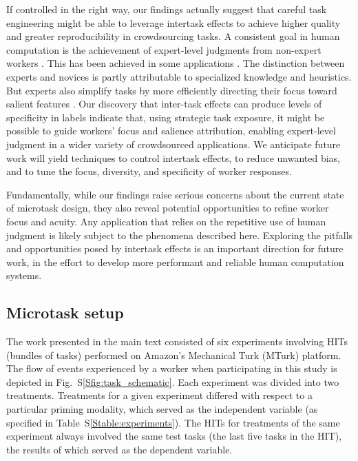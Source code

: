 \documentclass{pnastwo}
\begin{document}
\begin{article}
If controlled in the right way, our findings actually suggest that careful task
engineering might be able to leverage intertask effects to achieve higher 
quality and greater reproducibility in crowdsourcing tasks.  A consistent goal
in human computation is the achievement of expert-level judgments from
non-expert workers \cite{kittur2011crowdforge}.  This has been achieved in some
applications \cite{snow2008cheap,Mortensen20131020,Warby2014385}.  The
distinction between experts and novices is partly attributable to specialized
knowledge and heuristics.  But experts also simplify tasks by more efficiently
directing their focus toward salient features \cite{kellman2009perceptual}.
Our discovery that inter-task effects can produce levels of specificity in
labels indicate that, using strategic task exposure, it might be possible to
guide workers' focus and salience attribution, enabling expert-level judgment
in a wider variety of crowdsourced applications.  We anticipate future work
will yield techniques to control intertask effects, to reduce unwanted bias,
and to tune the focus, diversity, and specificity of worker responses.

Fundamentally, while our findings raise serious concerns about the current
state of microtask design, they also reveal potential opportunities to refine
worker focus and acuity.  Any application that relies on the repetitive use of
human judgment is likely subject to the phenomena described here.  Exploring
the pitfalls and opportunities posed by intertask effects is an important
direction for future work, in the effort to develop more performant and
reliable human computation systems.

\begin{materials}

\section{Microtask setup} The work presented in the main text consisted of six
experiments involving HITs (bundles of tasks) performed on Amazon's Mechanical
Turk (MTurk) platform.  The flow of events experienced by a worker when
participating in this study is depicted in Fig.~S\ref{Sfig:task_schematic}.
Each experiment was divided into two treatments.  Treatments for a given
experiment differed with respect to a particular priming modality, which served
as the independent variable (as specified in Table~S\ref{Stable:experiments}).
The HITs for treatments of the same experiment always involved the same test
tasks (the last five tasks in the HIT), the results of which served as the
dependent variable.


\end{materials}
\end{article}
\end{document}
